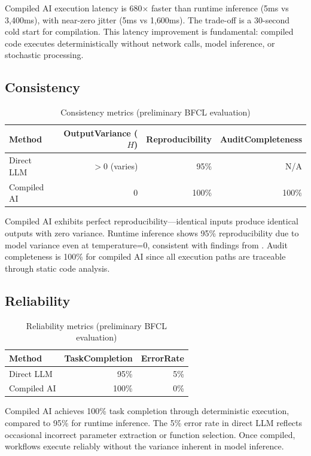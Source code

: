 \documentclass[11pt]{article}
\begin{document}
Compiled AI execution latency is 680$\times$ faster than runtime inference (5ms vs 3,400ms), with near-zero jitter (5ms vs 1,600ms). The trade-off is a 30-second cold start for compilation. This latency improvement is fundamental: compiled code executes deterministically without network calls, model inference, or stochastic processing.

\subsection{Consistency}

\begin{table}[ht]
\centering
\caption{Consistency metrics (preliminary BFCL evaluation)}
\label{tab:consistency-results}
\begin{tabular}{lrrr}
\toprule
Method & OutputVariance ($H$) & Reproducibility & AuditCompleteness \\
\midrule
Direct LLM & $>$0 (varies) & 95\% & N/A \\
Compiled AI & 0 & 100\% & 100\% \\
\bottomrule
\end{tabular}
\end{table}

Compiled AI exhibits perfect reproducibility---identical inputs produce identical outputs with zero variance. Runtime inference shows 95\% reproducibility due to model variance even at temperature=0, consistent with findings from \citet{atil2024nondeterminism}. Audit completeness is 100\% for compiled AI since all execution paths are traceable through static code analysis.

\subsection{Reliability}

\begin{table}[ht]
\centering
\caption{Reliability metrics (preliminary BFCL evaluation)}
\label{tab:reliability-results}
\begin{tabular}{lrr}
\toprule
Method & TaskCompletion & ErrorRate \\
\midrule
Direct LLM & 95\% & 5\% \\
Compiled AI & 100\% & 0\% \\
\bottomrule
\end{tabular}
\end{table}

Compiled AI achieves 100\% task completion through deterministic execution, compared to 95\% for runtime inference. The 5\% error rate in direct LLM reflects occasional incorrect parameter extraction or function selection. Once compiled, workflows execute reliably without the variance inherent in model inference.
\end{document}
